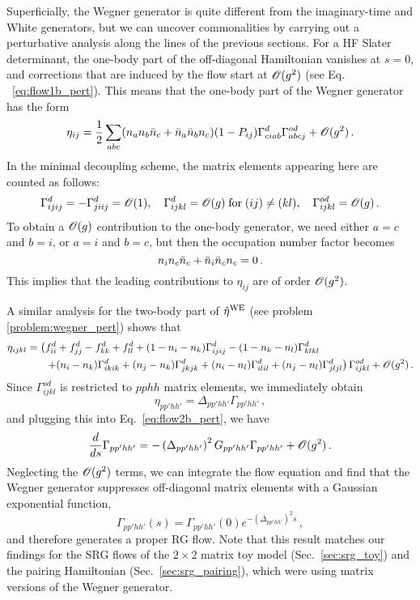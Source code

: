 {Superficially, the Wegner generator is quite different from the imaginary-time 
and White generators, but we can uncover commonalities by carrying out a 
perturbative analysis along the lines of the previous sections. For a HF 
Slater determinant, the one-body part of the off-diagonal Hamiltonian vanishes 
at $s=0$, and corrections that are induced by the flow start at $\mathcal{O}(g^2)$
(see Eq. ~\eqref{eq:flow1b_pert}). This means that the one-body part of
the Wegner generator has the form
\begin{equation}
  \eta_{ij} = \frac{1}{2} 
      \sum_{abc}(n_an_b\bar{n}_c+\bar{n}_a\bar{n}_bn_c) (1-P_{ij})\Gamma^d_{ciab}\Gamma^{od}_{abcj}
      + \mathcal{O}(g^2)\,.
\end{equation}
In the minimal decoupling scheme, the matrix elements appearing here are
counted as follows:
\begin{equation}
  \Gamma^d_{ijij} = -\Gamma^d_{jiij} = \mathcal{O}(1), \quad \Gamma^d_{ijkl} = \mathcal{O}(g)\; \text{for}\; (ij)\neq(kl), 
  \quad \Gamma^{od}_{ijkl} = \mathcal{O}(g)\,.
\end{equation}
To obtain a $\mathcal{O}(g)$ contribution to the one-body generator, we need
either $a=c$ and $b=i$, or $a=i$ and $b=c$, but then the occupation number
factor becomes
\begin{equation}
  n_{i}n_{c}\bar{n}_c + \bar{n}_{i} \bar{n}_{c} n_c = 0\,.
\end{equation}
This implies that the leading contributions to $\eta_{ij}$ are of order $\mathcal{O}(g^2)$.

A similar analysis for the two-body part of $\hat{\eta}^\text{WE}$ (see problem
\ref{problem:wegner_pert}) shows that
\begin{align}
  \eta_{ijkl}
    &=\left(f^d_{ii} + f^d_{jj} - f^d_{kk} + f^d_{ll} + (1-n_i-n_k)\Gamma^d_{ijij} - (1-n_k-n_l)\Gamma^d_{klkl} 
    \right.\notag\\
    &\hphantom{=}\left.\quad
    + (n_i-n_k) \Gamma^d_{ikik} + (n_j-n_k) \Gamma^d_{jkjk} + (n_i-n_l) \Gamma^d_{ilil} + (n_j-n_l) \Gamma^d_{jljl}
  \right)\Gamma^{od}_{ijkl}
  +\OC(g^2)\,.
  \label{eq:wegner2b_pert}
\end{align}
Since $\Gamma^{od}_{ijkl}$ is restricted to $pphh$ matrix elements, we immediately
obtain
\begin{equation}
  \eta_{pp'hh'} = \Delta_{pp'hh'}\Gamma_{pp'hh'}\,,
\end{equation}
and plugging this into Eq.~\eqref{eq:flow2b_pert}, we have
\begin{equation}
     \frac{d {}} {d {s}} \Gamma_{pp'hh'} 
  =-\left(\Delta_{pp'hh'}\right)^2G_{pp'hh'}\Gamma_{pp'hh'} + \mathcal{O}(g^2)\,.
\end{equation}
Neglecting the $\mathcal{O}(g^2)$ terms, we can integrate the flow equation
and find that the Wegner generator suppresses off-diagonal matrix
elements with a Gaussian exponential function,
\begin{equation}
  \Gamma_{pp'hh'}(s) = \Gamma_{pp'hh'}(0) e^{-(\Delta_{pp'hh'})^2s}\,,
\end{equation}
and therefore generates a proper RG flow. Note that this result matches 
our findings for the SRG flows of the 
$2\times2$ matrix toy model (Sec.~\ref{sec:srg_toy}) and the pairing 
Hamiltonian (Sec.~\ref{sec:srg_pairing}), which were using matrix 
versions of the Wegner generator.

}

